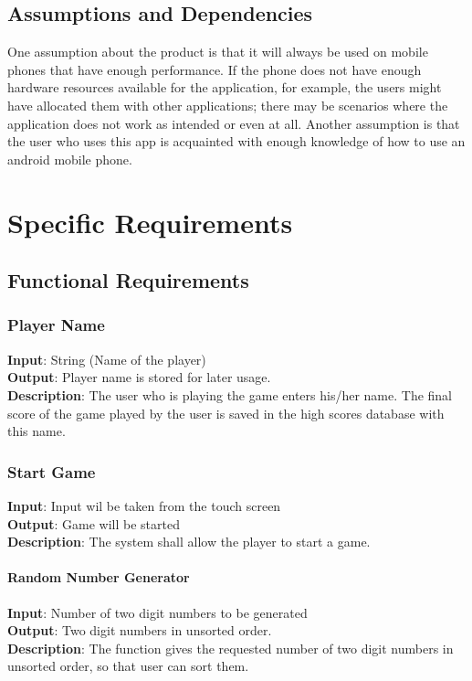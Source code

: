 \documentclass[a4paper,11pt]{article}
\begin{document}
\subsection{Assumptions and Dependencies}
One assumption about the product is that it will always be used on mobile phones that have enough performance. If the phone does not have enough hardware resources available for the application, for example, the users might have allocated them with other applications; there may be scenarios where the application does not work as intended or even at all. 
	Another assumption is that the user who uses this app is acquainted with enough knowledge of how to use an android mobile phone.

\section{Specific Requirements}
\subsection{Functional Requirements}
\subsubsection{Player Name} 
\textbf{Input}: String (Name of the player)\\
\textbf{Output}: Player name is stored for later usage.\\
\textbf{Description}: The user who is playing the game enters his/her name. The final score of the game played by the user is saved in the high scores database with this name.

\subsubsection{Start Game} 
\textbf{Input}: Input wil be taken from the touch screen\\
\textbf{Output}: Game will be started\\
\textbf{Description}: The system shall allow the player to start a game.

\paragraph{Random Number Generator}\hfill \break
\textbf{Input}: Number of two digit numbers to be generated\\
\textbf{Output}: Two digit numbers in unsorted order.\\
\textbf{Description}: The function gives the requested number of two digit numbers in unsorted order, so that user can sort them.
\end{document}
